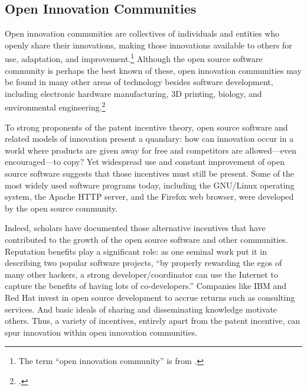 \documentclass[11pt,twocolumn,titlepage]{article}
\begin{document}
\subsection{Open Innovation Communities}
\SectionNote

Open innovation communities are collectives of individuals and entities who
openly share their innovations, making those innovations available
to others for use, adaptation, and improvement.\footnote{The term ``open
innovation community'' is from .} Although the open
source software community is perhaps the best known of these, open innovation
communities may be found in many other areas of technology besides software
development, including electronic hardware manufacturing, 3D printing, biology,
and environmental engineering.\footnote{.}

To strong proponents of the patent incentive theory, open source software and
related models of innovation present a quandary: how can innovation occur in a
world where products are given away for free and competitors are allowed---even
encouraged---to copy? Yet widespread use and constant improvement of open source
software suggests that those incentives must still be present. Some of the most
widely used software programs today, including the GNU/Linux operating system,
the Apache HTTP server, and the Firefox web browser, were developed by the open
source community.

Indeed, scholars have documented those alternative incentives that have
contributed to the growth of the open source software and other communities.
Reputation benefits play a significant role: as one seminal work put it in
describing two popular software projects, ``by properly rewarding the egos of
many other hackers, a strong developer/coordinator can use the Internet to
capture the benefits of having lots of co-developers.'' Companies like IBM and
Red Hat invest in open source development to accrue returns such as consulting
services. And basic ideals of sharing
and disseminating knowledge motivate others. Thus, a variety of incentives, entirely apart from the patent
incentive, can spur innovation within open innovation communities.
\end{document}
